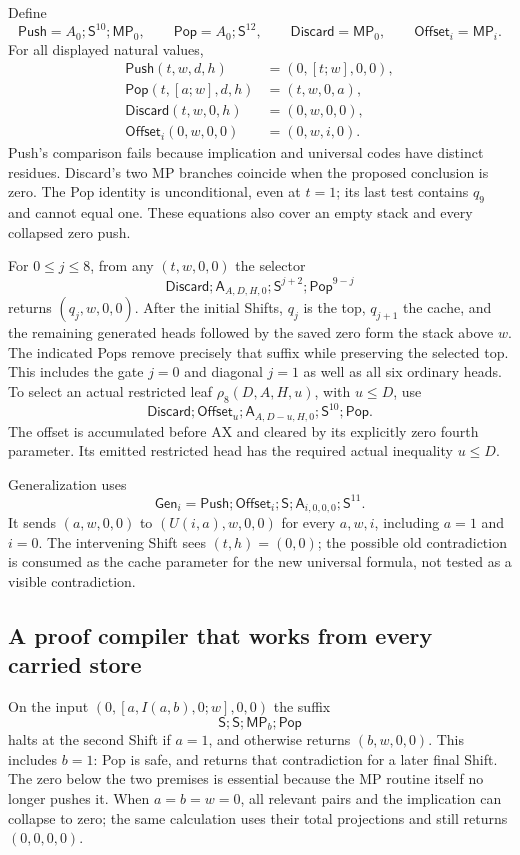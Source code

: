 Define
\[
 \mathsf{Push}=A_0;\mathsf S^{10};\mathsf{MP}_0,\qquad
 \mathsf{Pop}=A_0;\mathsf S^{12},\qquad
 \mathsf{Discard}=\mathsf{MP}_0,\qquad
 \mathsf{Offset}_i=\mathsf{MP}_i.
\]
For all displayed natural values,
\begin{align*}
 \mathsf{Push}(t,w,d,h)&=(0,[t;w],0,0),\\
 \mathsf{Pop}(t,[a;w],d,h)&=(t,w,0,a),\\
 \mathsf{Discard}(t,w,0,h)&=(0,w,0,0),\\
 \mathsf{Offset}_i(0,w,0,0)&=(0,w,i,0).
\end{align*}
Push's comparison fails because implication and universal codes have
distinct residues. Discard's two MP branches coincide when the proposed
conclusion is zero. The Pop identity is unconditional, even at $t=1$;
its last test contains $q_9$ and cannot equal one. These equations also
cover an empty stack and every collapsed zero push.

For $0\leq j\leq8$, from any $(t,w,0,0)$ the selector
\[
 \mathsf{Discard};\mathsf A_{A,D,H,0};
            \mathsf S^{j+2};\mathsf{Pop}^{9-j}             \tag{Sel}
\]
returns $(q_j,w,0,0)$. After the initial Shifts, $q_j$ is the top,
$q_{j+1}$ the cache, and the remaining generated heads followed by the
saved zero form the stack above $w$. The indicated Pops remove precisely
that suffix while preserving the selected top. This includes the gate
$j=0$ and diagonal $j=1$ as well as all six ordinary heads. To select an
actual restricted leaf $\rho_8(D,A,H,u)$, with $u\leq D$, use
\[
 \mathsf{Discard};\mathsf{Offset}_u;
 \mathsf A_{A,D-u,H,0};\mathsf S^{10};\mathsf{Pop}.
\]
The offset is accumulated before AX and cleared by its explicitly zero
fourth parameter. Its emitted restricted head has the required actual
inequality $u\leq D$.

Generalization uses
\[
 \mathsf{Gen}_i=\mathsf{Push};\mathsf{Offset}_i;\mathsf S;
                \mathsf A_{i,0,0,0};\mathsf S^{11}.
\]
It sends $(a,w,0,0)$ to $(U(i,a),w,0,0)$ for every $a,w,i$, including
$a=1$ and $i=0$. The intervening Shift sees $(t,h)=(0,0)$; the possible
old contradiction is consumed as the cache parameter for the new
universal formula, not tested as a visible contradiction.

\subsection{A proof compiler that works from every carried store}

On the input $(0,[a,I(a,b),0;w],0,0)$ the suffix
\[
                 \mathsf S;\mathsf S;\mathsf{MP}_b;\mathsf{Pop}
                                                               \tag{MPs}
\]
halts at the second Shift if $a=1$, and otherwise returns $(b,w,0,0)$.
This includes $b=1$: Pop is safe, and returns that contradiction for a
later final Shift. The zero below the two premises is essential because
the MP routine itself no longer pushes it. When $a=b=w=0$, all relevant
pairs and the implication can collapse to zero; the same calculation
uses their total projections and still returns $(0,0,0,0)$.

